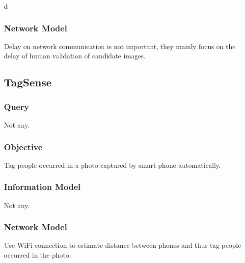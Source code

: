 d\documentclass[letterpaper]{sig-alternate-10pt}
\begin{document}
\subsubsection{Network Model}
Delay on network communication is not important, they mainly focus on the delay of human validation of candidate images.

\subsection{TagSense}
\subsubsection{Query}
Not any.
\subsubsection{Objective}
Tag people occurred in a photo captured by smart phone automatically.
\subsubsection{Information Model}
Not any.
\subsubsection{Network Model}
Use WiFi connection to estimate distance between phones and thus tag people occurred in the photo.





{\footnotesize


}
\end{document}
